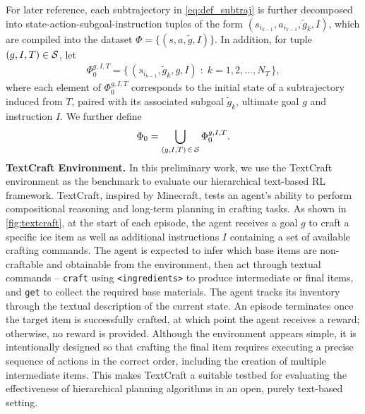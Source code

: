 For later reference, each subtrajectory in \cref{eq:def_subtraj} is further decomposed into state-action-subgoal-instruction tuples of the form
\((s_{i_{k-1}}, a_{i_{k-1}}, \tilde{g}_k, I)\), which are compiled into the dataset
\(\Phi = \{(s, a, \tilde{g}, I)\}\). In addition, for tuple $(g, I, T) \in \mathcal{S}$, let 
\begin{align}
    \Phi_0^{g, I, T} = \big\{\, (s_{i_{k-1}}, \tilde{g}_k, g, I) \;:\; k = 1, 2, \ldots, N_T \,\big\},
\end{align}
where each element of $\Phi_0^{g, I, T}$ corresponds to the initial state of a subtrajectory induced from $T$, paired with its associated subgoal $\tilde{g}_k$, ultimate goal $g$ and instruction $I$. We further define
\begin{align}
	\Phi_0 = \bigcup_{(g, I,T) \, \in \, \mathcal{S}} \Phi_0^{g, I, T}. 
\end{align}
\textbf{TextCraft Environment.} In this preliminary work, we use the TextCraft environment \citep{PrasadKHCSBK2024} as the benchmark to evaluate our hierarchical text-based RL framework. TextCraft, inspired by Minecraft, tests an agent's ability to perform compositional reasoning and long-term planning in crafting tasks. As shown in \cref{fig:textcraft}, at the start of each episode, the agent receives a goal $g$ to craft a specific ice item as well as additional instructions $I$ containing a set of available crafting commands. The agent is expected to infer which base items are non-craftable and obtainable from the environment, then act through textual commands -- \texttt{craft} using \texttt{<ingredients>} to produce intermediate or final items, and \texttt{get} to collect the required base materials. The agent tracks its inventory through the textual description of the current state. An episode terminates once the target item is successfully crafted, at which point the agent receives a reward; otherwise, no reward is provided. 
Although the environment appears simple, it is intentionally designed so that crafting the final item requires executing a precise sequence of actions in the correct order, including the creation of multiple intermediate items. This makes TextCraft a suitable testbed for evaluating the effectiveness of hierarchical planning algorithms in an open, purely text-based setting.



